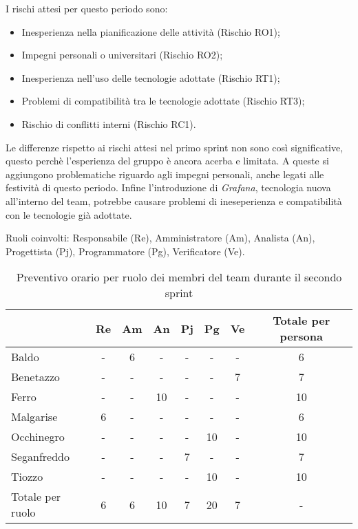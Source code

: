 I rischi attesi per questo periodo sono:
\begin{itemize}
    \item Inesperienza nella pianificazione delle attività (Rischio RO1);
    \item Impegni personali o universitari (Rischio RO2);
    \item Inesperienza nell'uso delle tecnologie adottate (Rischio RT1);
    \item Problemi di compatibilità tra le tecnologie adottate (Rischio RT3);
    \item Rischio di conflitti interni (Rischio RC1).
\end{itemize}
Le differenze rispetto ai rischi attesi nel primo sprint non sono così significative, questo perchè l'esperienza del gruppo è ancora acerba e limitata.
A queste si aggiungono problematiche riguardo agli impegni personali, anche legati alle festività di questo periodo. Infine l'introduzione di \textit{Grafana},
tecnologia nuova all'interno del team, potrebbe causare problemi di ineseperienza e compatibilità con le tecnologie già adottate.

Ruoli coinvolti: Responsabile (Re), Amministratore (Am), Analista (An), Progettista (Pj), Programmatore (Pg), Verificatore (Ve).
\begin{table}[!h]
    \centering
    \begin{tabular}{ | l | c | c | c | c | c | c | c | }
        \hline
        \textbf{} & \textbf{Re} & \textbf{Am} &\textbf{An} & \textbf{Pj} & \textbf{Pg} & \textbf{Ve} & \textbf{Totale per persona} \\
        \hline
        Baldo            &  -   &  6   &  -   &  -   &  -   &  -   &  6   \\
        Benetazzo        &  -   &  -   &  -   &  -   &  -   &  7   &  7   \\
        Ferro            &  -   &  -   & 10   &  -   &  -   &  -   & 10   \\
        Malgarise        &  6   &  -   &  -   &  -   &  -   &  -   &  6   \\
        Occhinegro       &  -   &  -   &  -   &  -   & 10   &  -   & 10   \\
        Seganfreddo      &  -   &  -   &  -   &  7   &  -   &  -   &  7   \\
        Tiozzo           &  -   &  -   &  -   &  -   & 10   &  -   & 10   \\
        \hline
        Totale per ruolo &  6   &  6   & 10   &  7   & 20   &  7   &  -   \\
        \hline
    \end{tabular}
    \caption{Preventivo orario per ruolo dei membri del team durante il secondo sprint}
    \label{tab:17}
\end{table}

